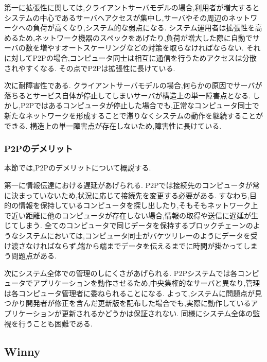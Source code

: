 第一に拡張性に関しては,クライアントサーバモデルの場合,利用者が増大するとシステムの中心であるサーバへアクセスが集中し,サーバやその周辺のネットワークへの負荷が高くなり,システム的な弱点になる.
システム運用者は拡張性を高めるため,ネットワーク機器のスペックをあげたり,負荷が増大した際に自動でサーバの数を増やすオートスケーリングなどの対策を取らなければならない.
それに対してP2Pの場合,コンピュータ同士は相互に通信を行うためアクセスは分散されやすくなる.
その点でP2Pは拡張性に長けている.

次に耐障害性である.
クライアントサーバモデルの場合,何らかの原因でサーバが落ちるとサービス自体が停止してしまいサーバが構造上の単一障害点となる.
しかし,P2Pではあるコンピュータが停止した場合でも,正常なコンピュータ同士で新たなネットワークを形成することで滞りなくシステムの動作を継続することができる.
構造上の単一障害点が存在しないため,障害性に長けている.

\subsubsection{P2Pのデメリット}

本節では,P2Pのデメリットについて概説する.

第一に情報伝達における遅延があげられる.
P2Pでは接続先のコンピュータが常に決まっていないため,状況に応じて接続先を変更する必要がある.
すなわち,目的の情報を保持しているコンピュータを探し出したり,そもそもネットワーク上で近い距離に他のコンピュータが存在しない場合,情報の取得や送信に遅延が生じてしまう.
全てのコンピュータで同じデータを保持するブロックチェーンのようなシステムにおいては,コンピュータ同士がバケツリレーのようにデータを受け渡さなければならず,端から端までデータを伝えるまでに時間が掛かってしまう問題点がある.

次にシステム全体での管理のしにくさがあげられる.
P2Pシステムでは各コンピュータでアプリケーションを動作させるため,中央集権的なサーバと異なり,管理は各コンピュータ管理者に委ねられることになる.
よって,システムに問題点が見つかり開発者が修正を含んだ更新版を配布した場合でも,実際に動作しているアプリケーションが更新されるかどうかは保証されない.
同様にシステム全体の監視を行うことも困難である.

\subsection{Winny}

